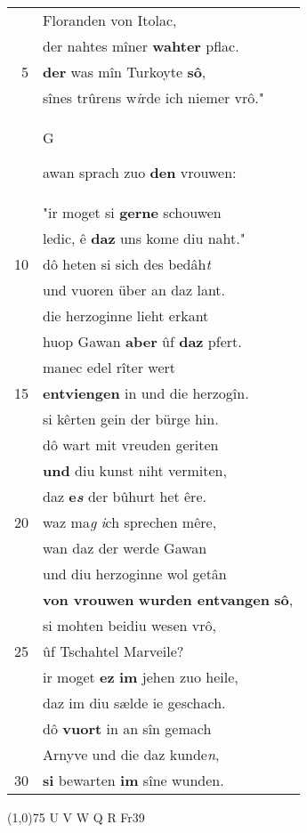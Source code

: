 \documentclass[8pt,a4paper,notitlepage]{article}
\begin{document}
\begin{table}[ht]
\begin{minipage}[t]{0.5\linewidth}
\begin{tabular}{rl}
 & Floranden von Itolac,\\ 
 & der nahtes mîner \textbf{wahter} pflac.\\ 
5 & \textbf{der} was mîn Turkoyte \textbf{sô},\\ 
 & sînes trûrens w\textit{i}rde ich niemer vrô."\\ 
 & \begin{large}G\end{large}awan sprach zuo \textbf{den} vrouwen:\\ 
 & "ir moget si \textbf{gerne} schouwen\\ 
 & ledic, ê \textbf{daz} uns kome diu naht."\\ 
10 & dô heten si sich des bedâh\textit{t}\\ 
 & und vuoren über an daz lant.\\ 
 & die herzoginne lieht erkant\\ 
 & huop Gawan \textbf{aber} ûf \textbf{daz} pfert.\\ 
 & manec edel rîter wert\\ 
15 & \textbf{entviengen} in und die herzogîn.\\ 
 & si kêrten gein der bürge hin.\\ 
 & dô wart mit vreuden geriten\\ 
 & \textbf{und} diu kunst niht vermiten,\\ 
 & daz \textbf{e\textit{s}} der bûhurt het êre.\\ 
20 & waz ma\textit{g} \textit{i}ch sprechen mêre,\\ 
 & wan daz der werde Gawan\\ 
 & und diu herzoginne wol getân\\ 
 & \textbf{von vrouwen} \textbf{wurden entvangen} \textbf{sô},\\ 
 & si mohten beidiu wesen vrô,\\ 
25 & ûf Tschahtel Marveile?\\ 
 & ir moget \textbf{ez} \textbf{im} jehen zuo heile,\\ 
 & daz im diu sælde ie geschach.\\ 
 & dô \textbf{vuort} in an sîn gemach\\ 
 & Arnyve und die daz kunde\textit{n},\\ 
30 & \textbf{si} bewarten \textbf{im} sîne wunden.\\ 
\end{tabular}
\scriptsize
\line(1,0){75} \newline
U V W Q R Fr39 \newline

\end{minipage}
\end{table}
\end{document}
